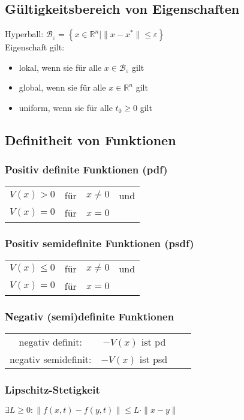 \documentclass[6pt,a4paper,fleqn]{scrartcl}
\begin{document}
\begin{multicols*}{4}
\subsection{Gültigkeitsbereich von Eigenschaften}
Hyperball: $\mathcal{B}_\varepsilon = \left\{ x \in \mathbb{R}^n | \|x-x^*\| \leq \varepsilon \right\}$ \\
Eigenschaft gilt:
\begin{itemize}
  \item lokal, wenn sie für alle $x \in \mathcal{B}_\varepsilon$ gilt
  \item global, wenn sie für alle $x \in \mathbb{R}^n$ gilt
  \item uniform, wenn sie für alle $t_0 \geq 0$ gilt
\end{itemize}

\subsection{Definitheit von Funktionen}

\subsubsection*{Positiv definite Funktionen (pdf)}
\begin{tabular}{cccc}
  $V(x) > 0$ & für & $x \neq 0$ & und \\
  $V(x) = 0$ & für & $x = 0$ &
\end{tabular}

\subsubsection*{Positiv semidefinite Funktionen (psdf)}
\begin{tabular}{cccc}
  $V(x) \leq 0$ & für & $x \neq 0$ & und \\
  $V(x) = 0$ & für & $x = 0$ &
\end{tabular}

\subsubsection*{Negativ (semi)definite Funktionen}
\begin{tabular}{cccc}
  negativ definit: & $-V(x)$ ist pd \\
  negativ semidefinit: & $-V(x)$ ist psd
\end{tabular}


\subsubsection*{Lipschitz-Stetigkeit}
$\exists L \geq 0 : \| f(x,t) - f(y,t) \| \leq L \cdot \|x-y\| $


\end{multicols*}
\end{document}
